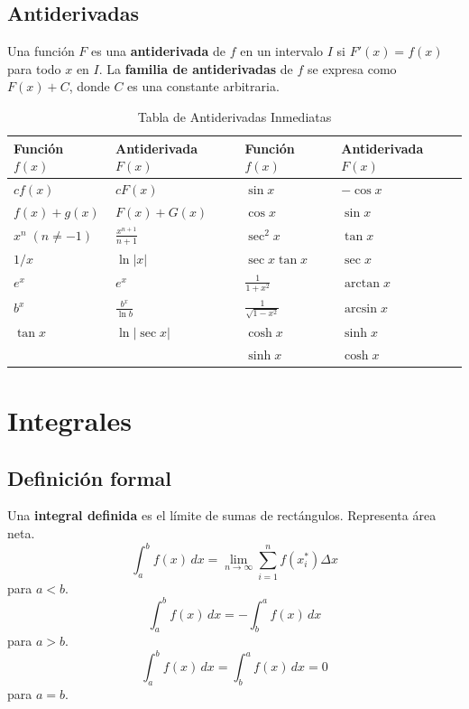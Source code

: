 \documentclass[a4paper,12pt]{article}
\theoremstyle{definition}
\begin{document}
\subsection{Antiderivadas}
Una función $F$ es una \textbf{antiderivada} de $f$ en un intervalo $I$ si $F'(x) = f(x)$ para todo $x$ en $I$. La \textbf{familia de antiderivadas} de $f$ se expresa como $F(x) + C$, donde $C$ es una constante arbitraria.

\begin{table}[h!]
    \centering
    \renewcommand{\arraystretch}{1.6} %
    \setlength{\tabcolsep}{10pt}      %
    \caption{Tabla de Antiderivadas Inmediatas}
    \begin{tabular}{l l | l l}
        \toprule
        \textbf{Función} $f(x)$ & \textbf{Antiderivada} $F(x)$ & \textbf{Función} $f(x)$ & \textbf{Antiderivada} $F(x)$ \\
        \midrule
        $c f(x)$ & $c F(x)$ & $\sin x$ & $-\cos x$ \\
        $f(x) + g(x)$ & $F(x) + G(x)$ & $\cos x$ & $\sin x$ \\
        $x^n \; (n \neq -1)$ & $\frac{x^{n+1}}{n+1}$ & $\sec^2 x$ & $\tan x$ \\
        $1/x$ & $\ln|x|$ & $\sec x \tan x$ & $\sec x$ \\
        $e^x$ & $e^x$ & $\frac{1}{1+x^2}$ & $\arctan x$ \\
        $b^x$ & $\frac{b^x}{\ln b}$ & $\frac{1}{\sqrt{1-x^2}}$ & $\arcsin x$ \\
        $\tan x$ & $\ln|\sec x|$ & $\cosh x$ & $\sinh x$ \\
        & & $\sinh x$ & $\cosh x$ \\
        \bottomrule
    \end{tabular}
\end{table}

\newpage

\section{Integrales}

\subsection{Definición formal}
Una \textbf{integral definida} es el límite de sumas de rectángulos. Representa área neta.
    \[ \int_{a}^{b} f(x) \, dx = \lim_{n \to \infty} \sum_{i=1}^{n} f(x_i^*) \Delta x \] para $a < b$.
    \[ \int_{a}^{b} f(x) \, dx = - \int_{b}^{a} f(x) \, dx \] para $a > b$.
    \[ \int_{a}^{b} f(x) \, dx = \int_{b}^{a} f(x) \, dx = 0 \] para $a = b$.
\end{document}

